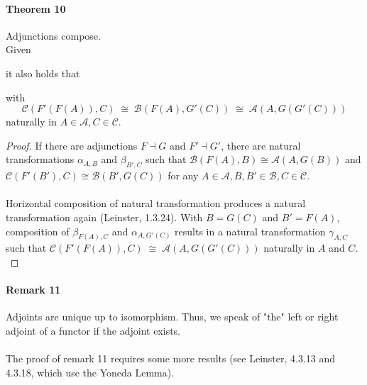 \paragraph{Theorem 10} 
	Adjunctions compose. \\Given
{}
	it also holds that 
	 with
	\[
	\mathscr C(F'(F(A)), C) \; \cong \; \mathscr B(F(A), G'(C))\; \cong \; \mathscr A(A, G(G'(C)))
	\]
	naturally in $A \in \mathscr A, C \in \mathscr C$.
	\begin{proof}
		If there are adjunctions $F \dashv G$ and $F' \dashv G'$, there are natural transformations $\alpha_{A,B}$ and $\beta_{B',C}$ such that $\mathscr B(F(A), B) \cong \mathscr{A}(A, G(B))$ and $\mathscr C(F'(B'), C) \cong \mathscr{B}(B', G(C))$ for any $A \in \mathscr A, B,B' \in \mathscr B, C \in \mathscr C$. \\\\
		Horizontal composition of natural transformation produces a natural transformation again (Leinster, 1.3.24). With $B = G(C)$ and $B' = F(A)$, composition of $\beta_{F(A), C} $ and $ \alpha_{A, G'(C)}$ results in a natural transformation  $\gamma_{A,C}$ such that $\mathscr C(F'(F(A)), C) \; \cong  \; \mathscr A(A, G(G'(C)))$ naturally in $A$ and $C$.\\
			\end{proof}\vspace{\baselineskip}
\paragraph{Remark 11} 
	Adjoints are unique up to isomorphism. Thus, we speak of "the" left or right adjoint of a functor if the adjoint exists.\\\\
	The proof of remark 11 requires some more results (see Leinster, 4.3.13 and 4.3.18, which use the Yoneda Lemma). \\\\
